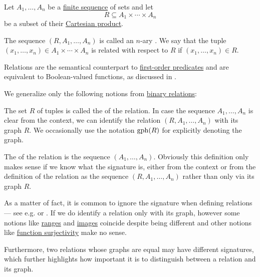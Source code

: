 \begin{definition}\label{def:relation}
  Let \( A_1, \ldots, A_n \) be a \hyperref[def:sequence]{finite sequence} of sets and let
  \begin{equation*}
    R \subseteq A_1 \times \cdots \times A_n
  \end{equation*}
  be a subset of their \hyperref[def:cartesian_product/product]{Cartesian product}.

  The sequence \( (R, A_1, \ldots, A_n) \) is called an \( n \)-ary . We say that the tuple \( (x_1, \ldots, x_n) \in A_1 \times \cdots \times A_n \) is related with respect to \( R \) if \( (x_1, \ldots, x_n) \in R \).

  Relations are the semantical counterpart to \hyperref[def:first_order_structure/interpretation/predicate]{first-order predicates} and are equivalent to Boolean-valued functions, as discussed in .

  We generalize only the following notions from \hyperref[def:binary_relation]{binary relations}:
  \begin{thmenum}[series=def:relation]
     The set \( R \) of tuples is called the  of the relation. In case the sequence \( A_1, \ldots, A_n \) is clear from the context, we can identify the relation \( (R, A_1, \ldots, A_n) \) with its graph \( R \). We occasionally use the notation \( \operatorname{gph}(R) \) for explicitly denoting the graph.

     The  of the relation is the sequence \( (A_1, \ldots, A_n) \). Obviously this definition only makes sense if we know what the signature is, either from the context or from the definition of the relation as the sequence \( (R, A_1, \ldots, A_n) \) rather than only via its graph \( R \).

    As a matter of fact, it is common to ignore the signature when defining relations --- see e.g. \cite[7]{Kelley1975} or \cite[def. 2.1]{OpenLogicFull}. If we do identify a relation only with its graph, however some notions like \hyperref[def:multi_valued_function/range]{ranges} and \hyperref[def:multi_valued_function/image]{images} coincide despite being different and other notions like \hyperref[def:function_invertibility/surjective]{function surjectivity} make no sense.

    Furthermore, two relations whose graphs are equal may have different signatures, which further highlights how important it is to distinguish between a relation and its graph.


\end{thmenum}
\end{definition}
